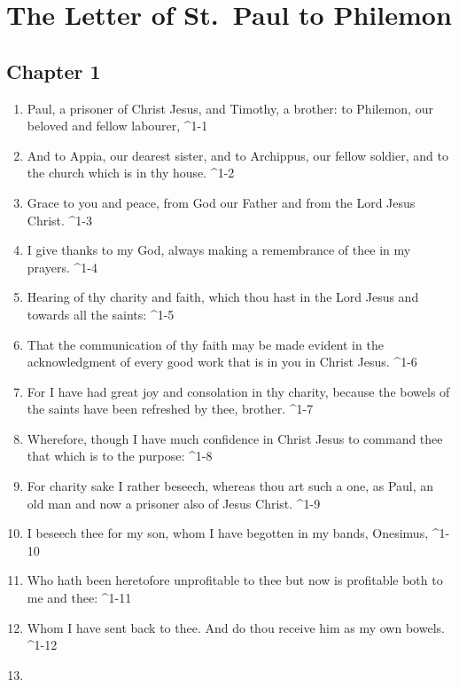 \documentclass[
]{article}
\author{}
\date{}
\providecommand{\tightlist}{%
  \setlength{\itemsep}{0pt}\setlength{\parskip}{0pt}}
\begin{document}
\hypertarget{the-letter-of-st.-paul-to-philemon}{%
\section{The Letter of St.~Paul to
Philemon}\label{the-letter-of-st.-paul-to-philemon}}

\hypertarget{chapter-1}{%
\subsection{Chapter 1}\label{chapter-1}}

\begin{enumerate}
\def\labelenumi{\arabic{enumi}.}
\tightlist
\item
  Paul, a prisoner of Christ Jesus, and Timothy, a brother: to Philemon,
  our beloved and fellow labourer, \^{}1-1
\item
  And to Appia, our dearest sister, and to Archippus, our fellow
  soldier, and to the church which is in thy house. \^{}1-2
\item
  Grace to you and peace, from God our Father and from the Lord Jesus
  Christ. \^{}1-3
\item
  I give thanks to my God, always making a remembrance of thee in my
  prayers. \^{}1-4
\item
  Hearing of thy charity and faith, which thou hast in the Lord Jesus
  and towards all the saints: \^{}1-5
\item
  That the communication of thy faith may be made evident in the
  acknowledgment of every good work that is in you in Christ Jesus.
  \^{}1-6
\item
  For I have had great joy and consolation in thy charity, because the
  bowels of the saints have been refreshed by thee, brother. \^{}1-7
\item
  Wherefore, though I have much confidence in Christ Jesus to command
  thee that which is to the purpose: \^{}1-8
\item
  For charity sake I rather beseech, whereas thou art such a one, as
  Paul, an old man and now a prisoner also of Jesus Christ. \^{}1-9
\item
  I beseech thee for my son, whom I have begotten in my bands, Onesimus,
  \^{}1-10
\item
  Who hath been heretofore unprofitable to thee but now is profitable
  both to me and thee: \^{}1-11
\item
  Whom I have sent back to thee. And do thou receive him as my own
  bowels. \^{}1-12
\item

\end{enumerate}
\end{document}
